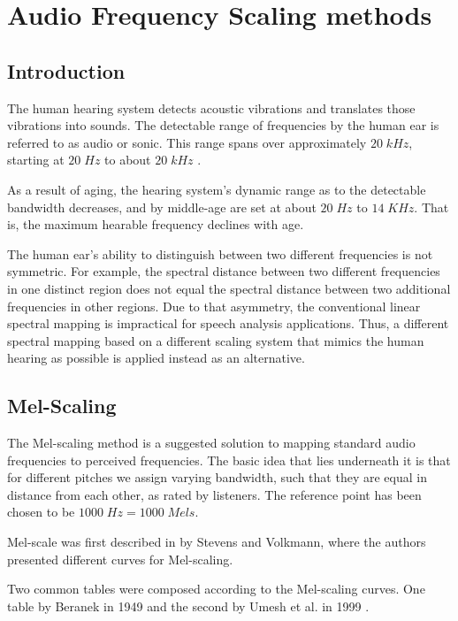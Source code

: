 \chapter{Audio Frequency Scaling methods}\label{ch:scaling_methods}
\section{Introduction}
The human hearing system detects
acoustic vibrations and translates 
those vibrations into sounds.
The detectable range of frequencies by the human ear
is referred to as audio or sonic. This range
spans over approximately \(20\;kHz\),
starting at \(20\;Hz\) to about \(20\;kHz\)
\cite{hearthres}.

As a result of aging, the hearing system's dynamic range 
as to the detectable bandwidth decreases,
and by middle-age are set at about
\(20\;Hz\) to  \(14\;KHz\)\cite{Wiley2008ChangesIH}.
That is, the maximum hearable frequency
declines with age.

The human ear's ability to distinguish 
between two different frequencies 
is not symmetric. 
For example, the spectral distance between two 
different frequencies in one distinct region does 
not equal the spectral distance 
between two additional frequencies in other regions.
Due to that asymmetry, the conventional linear 
spectral mapping is impractical for
speech analysis applications.
Thus, a different spectral mapping 
based on a different scaling system
that mimics the human hearing as possible
is applied instead as an alternative.

\section{Mel-Scaling}
The Mel-scaling method 
is a suggested solution to mapping 
standard audio frequencies to perceived frequencies.
The basic idea that lies underneath it is that for
different pitches we assign varying bandwidth,
such that they are equal in distance
from each other, as rated by listeners.
The reference point has been chosen to be 
\(1000\;Hz = 1000\;Mels\).

Mel-scale was first described in \cite{Volkmann} by Stevens and Volkmann,
where the authors presented different curves for Mel-scaling.

Two common tables were composed
according to the Mel-scaling curves. One table by 
Beranek in 1949 \cite{beranek1988acoustical} 
and the second by Umesh et al. in 1999 \cite{fitmelscale}.

